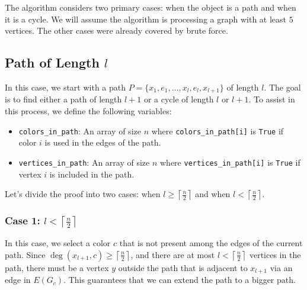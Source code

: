 The algorithm considers two primary cases: when the object is a path and when it is a cycle. We will assume the algorithm is processing a graph with at
least $5$ vertices. The other cases were already covered by brute force.

\subsection{Path of Length $l$}

In this case, we start with a path \( P = \{x_1, e_1, \dots, x_{l}, e_{l}, x_{l + 1}\} \) of length \( l \). The goal is to find either a path of length \( l+1 \) or a cycle of length \( l \) or \( l+1 \). To assist in this process, we define the following variables:

\begin{itemize}
    \item \texttt{colors\_in\_path}: An array of size \( n \) where \texttt{colors\_in\_path[i]} is \texttt{True} if color \( i \) is used in the edges of the path.
    \item \texttt{vertices\_in\_path}: An array of size \( n \) where \texttt{vertices\_in\_path[i]} is \texttt{True} if vertex \( i \) is included in the path.
\end{itemize}

Let's divide the proof into two cases: when \( l \geq \left \lceil \frac{n}{2} \right \rceil \) and when \( l < \left \lceil \frac{n}{2} \right \rceil \).

\subsubsection{Case 1: \( l < \left \lceil \frac{n}{2} \right \rceil \)}

In this case, we select a color \( c \) that is not present among 
the edges of the current path. Since 
\( \deg(x_{l + 1}, c) \geq \left \lceil \frac{n}{2} \right \rceil \), 
and there are at most 
\( l < \left \lceil \frac{n}{2} \right \rceil \) 
vertices in the path, there must be a vertex 
\( y \) 
outside the path that is adjacent to 
\( x_{l + 1} \) via an edge in \( E(G_c) \). 
This guarantees that we can extend the path to a bigger path.

